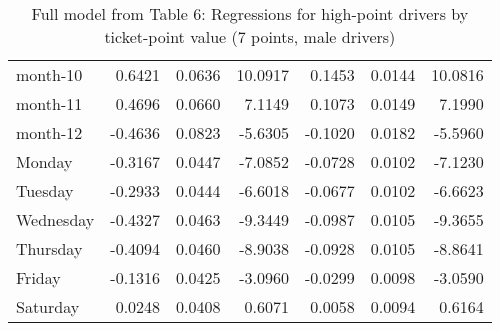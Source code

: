 \documentclass[10pt]{article}
\begin{document}
\begin{table}[ht]
\begin{tabular}{lrrrrrr}
  month-10 & 0.6421 & 0.0636 & 10.0917 & 0.1453 & 0.0144 & 10.0816 \\ 
  month-11 & 0.4696 & 0.0660 & 7.1149 & 0.1073 & 0.0149 & 7.1990 \\ 
  month-12 & -0.4636 & 0.0823 & -5.6305 & -0.1020 & 0.0182 & -5.5960 \\ 
  Monday & -0.3167 & 0.0447 & -7.0852 & -0.0728 & 0.0102 & -7.1230 \\ 
  Tuesday & -0.2933 & 0.0444 & -6.6018 & -0.0677 & 0.0102 & -6.6623 \\ 
  Wednesday & -0.4327 & 0.0463 & -9.3449 & -0.0987 & 0.0105 & -9.3655 \\ 
  Thursday & -0.4094 & 0.0460 & -8.9038 & -0.0928 & 0.0105 & -8.8641 \\ 
  Friday & -0.1316 & 0.0425 & -3.0960 & -0.0299 & 0.0098 & -3.0590 \\ 
  Saturday & 0.0248 & 0.0408 & 0.6071 & 0.0058 & 0.0094 & 0.6164 \\ 
   \hline
\end{tabular}
\caption{Full model from Table 6: Regressions for high-point drivers by ticket-point value (7 points, male drivers)} 
\label{tab_6_7_pts_no_age_M}
\end{table}


\clearpage
\pagebreak



\end{document}
